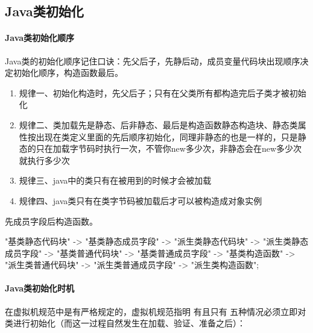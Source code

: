 \documentclass[../../../interview-questions.tex]{subfiles}
\begin{document}
\subsection{Java类初始化}

\paragraph{Java类初始化顺序}

Java类的初始化顺序记住口诀：先父后子，先静后动，成员变量代码块出现顺序决定初始化顺序，构造函数最后。

\begin{enumerate}
\item{规律一、初始化构造时，先父后子；只有在父类所有都构造完后子类才被初始化}
\item{规律二、类加载先是静态、后非静态、最后是构造函数}静态构造块、静态类属性按出现在类定义里面的先后顺序初始化，同理非静态的也是一样的，只是静态的只在加载字节码时执行一次，不管你new多少次，非静态会在new多少次就执行多少次
\item{规律三、java中的类只有在被用到的时候才会被加载}
\item{规律四、java类只有在类字节码被加载后才可以被构造成对象实例}
\end{enumerate}

先成员字段后构造函数。

"基类静态代码块" -> "基类静态成员字段" -> "派生类静态代码块"
    -> "派生类静态成员字段" -> "基类普通代码块" -> "基类普通成员字段"
    -> "基类构造函数" -> "派生类普通代码块"
    -> "派生类普通成员字段" -> "派生类构造函数";

\paragraph{Java类初始化时机}
    
在虚拟机规范中是有严格规定的，虚拟机规范指明 有且只有 五种情况必须立即对类进行初始化（而这一过程自然发生在加载、验证、准备之后）：
\end{document}
